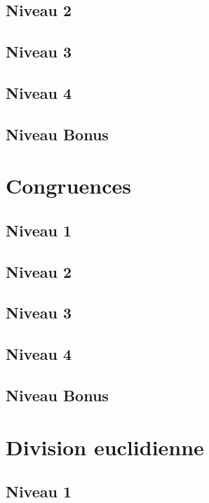 \documentclass[a4paper]{report}
\begin{document}
			\subsection{Niveau 2}
		
			\subsection{Niveau 3}
			
			\subsection{Niveau 4}
			
			\subsection{Niveau Bonus}
		
		\section{Congruences}
		
			\subsection{Niveau 1}
		
			\subsection{Niveau 2}
		
			\subsection{Niveau 3}
			
			\subsection{Niveau 4}
			
			\subsection{Niveau Bonus}
		
		\section{Division euclidienne}
		
			\subsection{Niveau 1}
		
\end{document}
